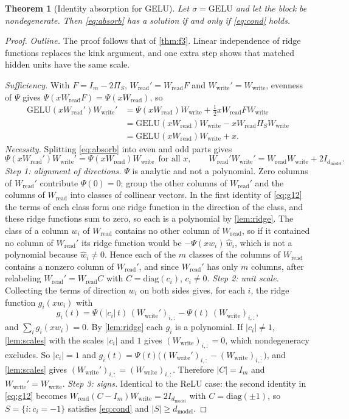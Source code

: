 \documentclass[10pt]{article}
\newtheorem{theorem}{Theorem}[section]
\theoremstyle{definition}
\theoremstyle{remark}
\newcommand{\Wread}{W_{\mathrm{read}}}
\newcommand{\Wwrite}{W_{\mathrm{write}}}
\newcommand{\dm}{d_{\mathrm{model}}}
\begin{document}
\begin{theorem}[Identity absorption for GELU]\label{thm:f4}
Let $\sigma = \mathrm{GELU}$ and let the block be nondegenerate. Then \eqref{eq:absorb} has a solution if and only if \eqref{eq:cond} holds.
\end{theorem}
\begin{proof}
\emph{Outline.} The proof follows that of \cref{thm:f3}. Linear independence of ridge functions replaces the kink argument, and one extra step shows that matched hidden units have the same scale.

\emph{Sufficiency.} With $F = I_m - 2\Pi_S$, $\Wread' = \Wread F$ and $\Wwrite' = \Wwrite$, evenness of $\Psi$ gives $\Psi(x\Wread F) = \Psi(x\Wread)$, so
\begin{align*}
\mathrm{GELU}(x\Wread')\Wwrite' &= \Psi(x\Wread)\Wwrite + \tfrac12 x\Wread F\Wwrite \\
&= \mathrm{GELU}(x\Wread)\Wwrite - x\Wread\Pi_S\Wwrite \\
&= \mathrm{GELU}(x\Wread)\Wwrite + x .
\end{align*}
\emph{Necessity.} Splitting \eqref{eq:absorb} into even and odd parts gives
\begin{equation}\label{eq:g12}
\Psi(x\Wread')\Wwrite' = \Psi(x\Wread)\Wwrite\ \ \text{for all } x,\qquad \Wread'\Wwrite' = \Wread\Wwrite + 2I_{\dm} .
\end{equation}
\emph{Step 1: alignment of directions.} $\Psi$ is analytic and not a polynomial. Zero columns of $\Wread'$ contribute $\Psi(0) = 0$; group the other columns of $\Wread'$ and the columns of $\Wread$ into classes of collinear vectors. In the first identity of \eqref{eq:g12} the terms of each class form one ridge function in the direction of the class, and these ridge functions sum to zero, so each is a polynomial by \cref{lem:ridge}. The class of a column $w_i$ of $\Wread$ contains no other column of $\Wread$, so if it contained no column of $\Wread'$ its ridge function would be $-\Psi(x w_i)\,\hat w_i$, which is not a polynomial because $\hat w_i \neq 0$. Hence each of the $m$ classes of the columns of $\Wread$ contains a nonzero column of $\Wread'$, and since $\Wread'$ has only $m$ columns, after relabeling $\Wread' = \Wread C$ with $C = \mathrm{diag}(c_i)$, $c_i \neq 0$.
\emph{Step 2: unit scale.} Collecting the terms of direction $w_i$ on both sides gives, for each $i$, the ridge function $g_i(x w_i)$ with
\[
g_i(t) = \Psi(|c_i|\,t)\,(\Wwrite')_{i,:} - \Psi(t)\,(\Wwrite)_{i,:},
\]
and $\sum_i g_i(x w_i) = 0$. By \cref{lem:ridge} each $g_i$ is a polynomial. If $|c_i| \neq 1$, \cref{lem:scales} with the scales $|c_i|$ and $1$ gives $(\Wwrite)_{i,:} = 0$, which nondegeneracy excludes. So $|c_i| = 1$ and $g_i(t) = \Psi(t)\big((\Wwrite')_{i,:} - (\Wwrite)_{i,:}\big)$, and \cref{lem:scales} gives $(\Wwrite')_{i,:} = (\Wwrite)_{i,:}$. Therefore $|C| = I_m$ and $\Wwrite' = \Wwrite$.
\emph{Step 3: signs.} Identical to the ReLU case: the second identity in \eqref{eq:g12} becomes $\Wread(C - I_m)\Wwrite = 2I_{\dm}$ with $C = \mathrm{diag}(\pm1)$, so $S = \{i : c_i = -1\}$ satisfies \eqref{eq:cond} and $|S| \ge \dm$.
\end{proof}
\end{document}
